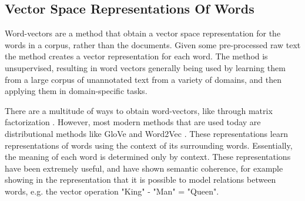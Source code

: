 






\subsection{Vector Space Representations Of Words}\label{bg:WordVectors}

Word-vectors are a method that obtain a vector space representation for the words in a corpus, rather than the documents. Given some pre-processed raw text the method creates a vector representation for each word. The method is unsupervised, resulting in word vectors generally being used by learning them from a large corpus of unannotated text from a variety of domains, and then applying them in domain-specific tasks.

There are a multitude of ways to obtain word-vectors, like through matrix factorization \cite{Evy2007}. However, most modern methods that are used today are distributional methods like GloVe \cite{Pennington2014} and Word2Vec \cite{Mikolov2013}. These representations learn representations of  words using the context of its surrounding words.  Essentially, the meaning of each word is determined only by  context. These representations have been extremely useful, and have shown semantic coherence, for example showing in the  representation that it is possible to  model relations between words, e.g.  the  vector operation  "King" - "Man" = "Queen".             

